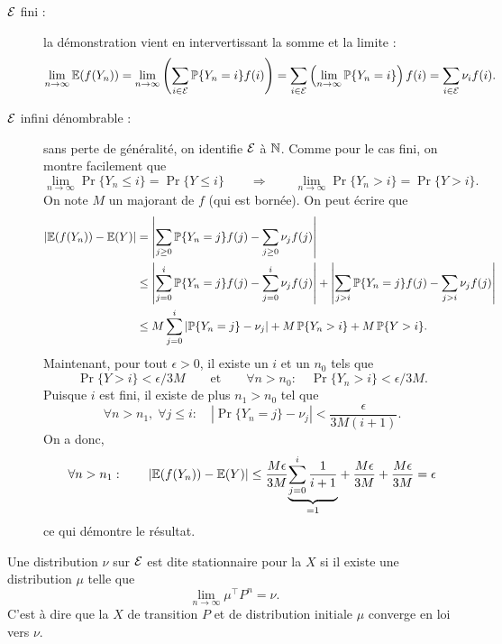 \proof
\begin{description}
  \item[$\mathcal{E}$ fini :] la démonstration vient en intervertissant la somme et la limite : 
  $$
  \lim_{n \rightarrow \infty} \operatorname{\mathbb{E}}(f(Y_n)) 
  = \lim_{n \rightarrow \infty} \left(\sum_{i \in \mathcal{E}} \operatorname{\mathbb{P}}\{Y_n = i\} f(i)\right)
  = \sum_{i \in \mathcal{E}} \left(\lim_{n \rightarrow \infty} \operatorname{\mathbb{P}}\{Y_n = i\} \right) f(i) 
  = \sum_{i \in \mathcal{E}} \nu_i f(i).
  $$
  \item[$\mathcal{E}$ infini dénombrable :] sans perte de généralité, on identifie $\mathcal{E}$ à $\mathbb{N}$. Comme pour le cas fini, on montre facilement que 
  $$
  \lim_{n \rightarrow \infty} \Pr\{Y_n \leq i\} = \Pr\{Y \leq i\}
  \qquad \Rightarrow \qquad 
  \lim_{n \rightarrow \infty} \Pr\{Y_n > i\} = \Pr\{Y > i\}.
  $$
  On note $M$ un majorant de $f$ (qui est bornée). On peut écrire que
  \begin{align*}
    \left|\operatorname{\mathbb{E}}(f(Y_n)) - \operatorname{\mathbb{E}}(Y)\right|
    & = \left|\sum_{j \geq 0} \operatorname{\mathbb{P}}\{Y_n=j\} f(j) - \sum_{j \geq 0} \nu_j f(j)\right| \\
    & \leq \left|\sum_{j=0}^i \operatorname{\mathbb{P}}\{Y_n=j\} f(j) - \sum_{j=0}^i \nu_j f(j)\right|
    + \left|\sum_{j > i} \operatorname{\mathbb{P}}\{Y_n=j\} f(j) - \sum_{j > i} \nu_j f(j)\right| \\
    & \leq M \sum_{j=0}^i \left|\operatorname{\mathbb{P}}\{Y_n=j\} - \nu_j\right| + M \operatorname{\mathbb{P}}\{Y_n > i\} + M \operatorname{\mathbb{P}}\{Y > i\}.
  \end{align*}
  Maintenant, pour tout $\epsilon > 0$, il existe un $i$ et un $n_0$ tels que 
  $$
  \Pr\{Y > i\} < \epsilon / 3M
  \qquad \text{et} \qquad 
  \forall n > n_0: \quad \Pr\{Y_n > i\} < \epsilon / 3M.
  $$
  Puisque $i$ est fini, il existe de plus $n_1 > n_0$ tel que 
  $$
  \forall n > n_1, \; \forall j \leq i: \quad \left|\Pr\{Y_n=j\} - \nu_j\right| < \frac\epsilon{3M(i+1)}.
  $$
  On a donc, 
 \begin{align*}
   \forall n > n_1: \qquad 
   \left|\operatorname{\mathbb{E}}(f(Y_n)) - \operatorname{\mathbb{E}}(Y)\right| \leq \frac{M\epsilon}{3M} \underset{=1}{\underbrace{\sum_{j=0}^i \frac1{i+1}}} + \frac{M\epsilon}{3M} + \frac{M\epsilon}{3M} = \epsilon
  \end{align*}
  ce qui démontre le résultat.
\end{description}
\eproof

\begin{definition*}
  Une distribution $\nu$ sur $\mathcal{E}$ est dite stationnaire pour la \cM $X$ si il existe une distribution $\mu$ telle que 
  $$
  \lim_{n \rightarrow \infty} \mu^\top P^n = \nu.
  $$
  C'est à dire que la \cM $X$ de transition $P$ et de distribution initiale $\mu$ converge en loi vers $\nu$.
\end{definition*}

